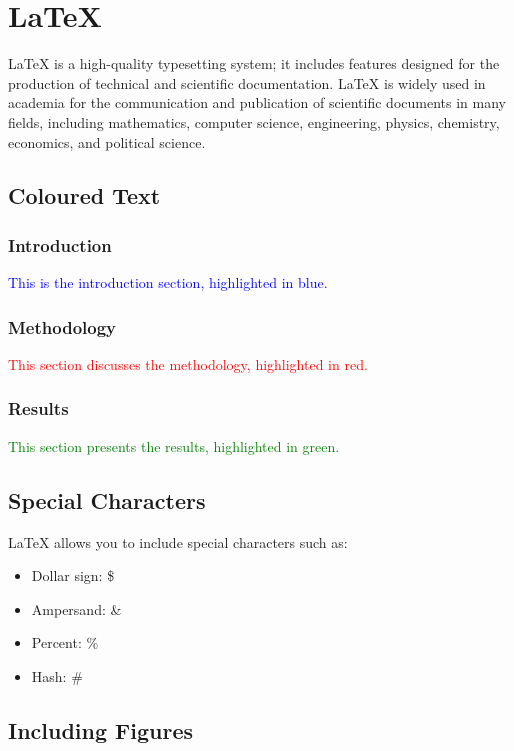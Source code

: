 \documentclass{article}
\begin{document}
	
	\section{LaTeX}
	
	LaTeX is a high-quality typesetting system; it includes features designed for the production of technical
	and scientific documentation. LaTeX is widely used in academia for the communication and publication
	of scientific documents in many fields, including mathematics, computer science, engineering, physics,
	chemistry, economics, and political science.
	
	\subsection{Coloured Text}
	
	\subsubsection*{Introduction}
	
	\textcolor{blue}{This is the introduction section, highlighted in blue.}
	
	\subsubsection*{Methodology}
	
	\textcolor{red}{This section discusses the methodology, highlighted in red.}
	
	\subsubsection*{Results}
	
	\textcolor{green}{This section presents the results, highlighted in green.}
	
	\subsection{Special Characters}
	
	LaTeX allows you to include special characters such as:
	\begin{itemize}
		\item Dollar sign: \$
		\item Ampersand: \&
		\item Percent: \%
		\item Hash: \#
	\end{itemize}
	
	\subsection{Including Figures}
	
\end{document}
